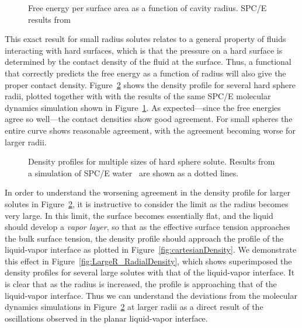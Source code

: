 \documentclass[letterpaper,twocolumn,amsmath,amssymb,prb]{revtex4}
\begin{document}
\begin{figure}
\begin{center}
\end{center}
\caption{Free energy per surface area as a function of cavity
  radius. SPC/E results from~\cite{huang2001shs}}
\label{fig:surfaceTension}
\end{figure}

This exact result for small radius solutes relates to a general property of
fluids interacting with hard surfaces, which is that the pressure on a hard
surface is determined by the contact density of the fluid at the surface.
Thus, a functional that correctly predicts the free energy as a function of
radius will also give the proper contact density.
Figure~\ref{fig:cavities} shows the density profile for several hard sphere
radii, plotted together with with the results of the same SPC/E molecular
dynamics simulation shown in
Figure~\ref{fig:surfaceTension}\cite{huang2001shs}.  As expected---since
the free energies agree so well---the contact densities show good
agreement.  For small spheres the entire curve shows reasonable agreement,
with the agreement becoming worse for larger radii.

\begin{figure}[b]
\begin{center}
\end{center}
\caption{Density profiles for multiple sizes of hard sphere solute.
  Results from a simulation of SPC/E water~\cite{huang2001shs} are
  shown as a dotted lines.}
\label{fig:cavities}
\end{figure}

In order to understand the worsening agreement in the density profile
for larger solutes in Figure~\ref{fig:cavities}, it is instructive to
consider the limit as the radius becomes very large.  In this limit,
the surface becomes essentially flat, and the liquid should develop a
\emph{vapor layer}, so that as the effective surface tension
approaches the bulk surface tension, the density profile should
approach the profile of the liquid-vapor interface as plotted in
Figure~\ref{fig:cartesianDensity}.  We demonstrate this effect in
Figure~\ref{fig:LargeR_RadialDensity}, which shows superimposed the
density profiles for several large solutes with that of the
liquid-vapor interface.  It is clear that as the radius is increased,
the profile is approaching that of the liquid-vapor interface.  Thus
we can understand the deviations from the molecular dynamics
simulations in Figure~\ref{fig:cavities} at larger radii as a direct
result of the oscillations observed in the planar liquid-vapor
interface.
\end{document}
